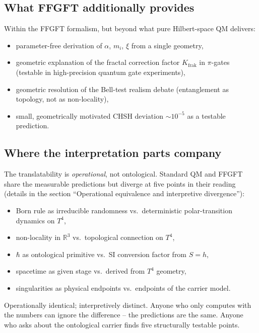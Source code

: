 \subsection*{What FFGFT additionally provides}

Within the FFGFT formalism, but beyond what pure Hilbert-space QM
delivers:

\begin{itemize}[leftmargin=2em,itemsep=2pt,topsep=2pt]
  \item parameter-free derivation of $\alpha$, $m_i$, $\xi$ from a
        single geometry,
  \item geometric explanation of the fractal correction factor
        $K_{\text{frak}}$ in $\pi$-gates (testable in
        high-precision quantum gate experiments),
  \item geometric resolution of the Bell-test realism debate
        (entanglement as topology, not as non-locality),
  \item small, geometrically motivated CHSH deviation $\sim 10^{-5}$
        as a testable prediction.
\end{itemize}

\subsection*{Where the interpretation parts company}

The translatability is \emph{operational}, not ontological. Standard
QM and FFGFT share the measurable predictions but diverge at five
points in their reading (details in the section ``Operational
equivalence and interpretive divergence''):

\begin{itemize}[leftmargin=2em,itemsep=2pt,topsep=2pt]
  \item Born rule as irreducible randomness vs.\ deterministic
        polar-transition dynamics on $T^4$,
  \item non-locality in $\mathbb{R}^3$ vs.\ topological connection
        on $T^4$,
  \item $\hbar$ as ontological primitive vs.\ SI conversion factor
        from $S=h$,
  \item spacetime as given stage vs.\ derived from $T^4$ geometry,
  \item singularities as physical endpoints vs.\ endpoints of the
        carrier model.
\end{itemize}

Operationally identical; interpretively distinct. Anyone who only
computes with the numbers can ignore the difference -- the
predictions are the same. Anyone who asks about the ontological
carrier finds five structurally testable points.

